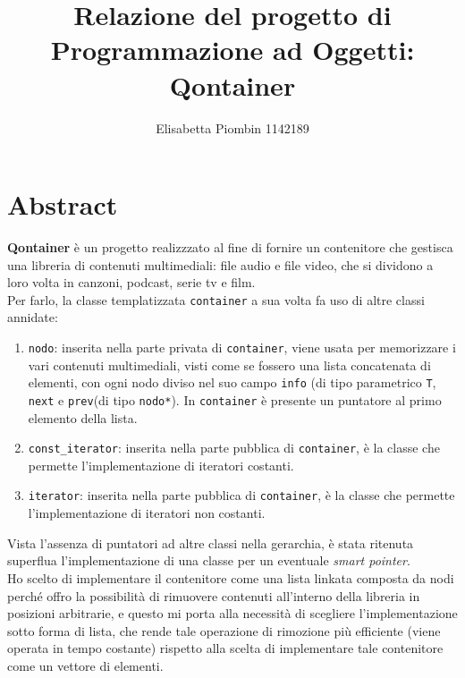 \documentclass[a4paper,10pt]{article}
\begin{document}
\title {Relazione del progetto di Programmazione ad Oggetti: Qontainer}
\author {Elisabetta Piombin 1142189}
\date{}

\maketitle
\clearpage
\tableofcontents
\clearpage\mbox{}

\section{Abstract}
\textbf{Qontainer} è un progetto realizzzato al fine di fornire un contenitore che gestisca una libreria di contenuti multimediali: file audio e file video, che si dividono a loro volta in canzoni, podcast, serie tv e film. \\
Per farlo, la classe templatizzata \texttt{container} a sua volta fa uso di altre classi annidate:
\begin{enumerate}
\item \texttt{nodo}: inserita nella parte privata di \texttt{container}, viene usata per memorizzare i vari contenuti multimediali, visti come se fossero una lista concatenata di elementi, con ogni nodo diviso nel suo campo \texttt{info} (di tipo parametrico \texttt{T}, \texttt{next} e \texttt{prev}(di tipo \texttt{nodo*}). In \texttt{container} è presente un puntatore al primo elemento della lista.
\item \texttt{const\_iterator}: inserita nella parte pubblica di \texttt{container}, è la classe che permette l'implementazione di iteratori costanti.
\item \texttt{iterator}: inserita nella parte pubblica di \texttt{container}, è la classe che permette l'implementazione di iteratori non costanti.
\end{enumerate}
Vista l'assenza di puntatori ad altre classi nella gerarchia, è stata ritenuta superflua l'implementazione di una classe per un eventuale \textit{smart pointer}.\\
Ho scelto di implementare il contenitore come una lista linkata composta da nodi perché offro la possibilità di rimuovere contenuti all'interno della libreria in posizioni arbitrarie, e questo mi porta alla necessità di scegliere l'implementazione sotto forma di lista, che rende tale operazione di rimozione più efficiente (viene operata in tempo costante) rispetto alla scelta di implementare tale contenitore come un vettore di elementi.
\end{document}
